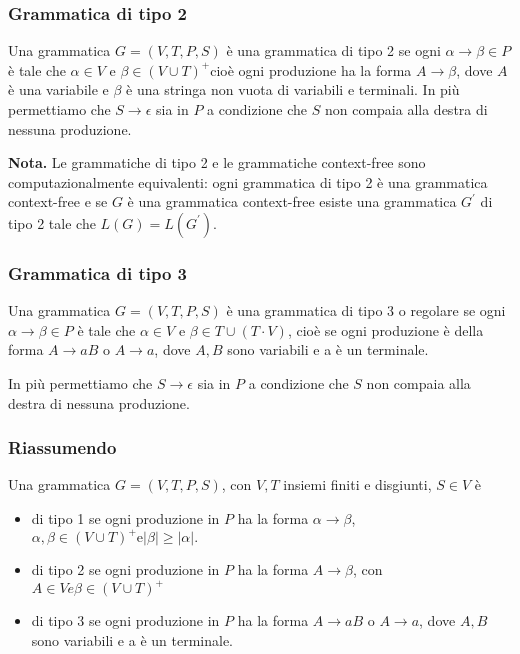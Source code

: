 \subsubsection{Grammatica di tipo 2}

Una grammatica $G=(V, T, P, S)$ è una grammatica di tipo 2 se ogni $\alpha \rightarrow \beta \in P$ è tale che $\alpha \in V$ e $\beta \in(V \cup T)^{+}$cioè ogni produzione ha la forma $A \rightarrow \beta$, dove $A$ è una variabile e $\beta$ è una stringa non vuota di variabili e terminali.
In più permettiamo che $S \rightarrow \epsilon$ sia in $P$ a condizione che $S$ non compaia alla destra di nessuna produzione.

\vspace{5mm}

\textbf{Nota.} Le grammatiche di tipo 2 e le grammatiche context-free sono computazionalmente equivalenti: ogni grammatica di tipo 2 è una grammatica context-free e se $G$ è una grammatica context-free esiste una grammatica $G^{\prime}$ di tipo 2 tale che $L(G)=L\left(G^{\prime}\right)$.


\subsubsection{Grammatica di tipo 3}

Una grammatica $G=(V, T, P, S)$ è una grammatica di tipo 3 o regolare se ogni $\alpha \rightarrow \beta \in P$ è tale che $\alpha \in V$ e $\beta \in T \cup(T \cdot V)$, cioè se ogni produzione è della forma $A \rightarrow a B$ o $A \rightarrow a$, dove $A, B$ sono variabili e a è un terminale.

In più permettiamo che $S \rightarrow \epsilon$ sia in $P$ a condizione che $S$ non compaia alla destra di nessuna produzione.

\subsubsection{Riassumendo}

Una grammatica $G=(V, T, P, S)$, con $V, T$ insiemi finiti e disgiunti, $S \in V$ è
\begin{itemize}
    \item di tipo 1 se ogni produzione in $P$ ha la forma $\alpha \rightarrow \beta$, $\alpha, \beta \in(V \cup T)^{+} \mathrm{e}|\beta| \geq|\alpha| .$
    \item di tipo 2 se ogni produzione in $P$ ha la forma $A \rightarrow \beta$, con $A \in V e \beta \in(V \cup T)^{+}$
    \item di tipo 3 se ogni produzione in $P$ ha la forma $A \rightarrow a B$ o $A \rightarrow a$, dove $A, B$ sono variabili e a è un terminale.
\end{itemize}

